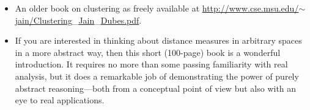 \begin{itemize}
\item {}
  An older book on clustering as freely available at
  \url{http://www.cse.msu.edu/}$\sim$\url{jain/Clustering}\_\url{Jain}\_\url{Dubes.pdf}.

\item {} 
  If you are interested in thinking about distance measures in
  arbitrary spaces in a more abstract way, then this short (100-page)
  book is a wonderful introduction. It requires no more than some
  passing familiarity with real analysis, but it does a remarkable job
  of demonstrating the power of purely abstract reasoning---both from
  a conceptual point of view but also with an eye to real
  applications.
\end{itemize}


\clearpage

\thispagestyle{empty}

\cleardoublepage